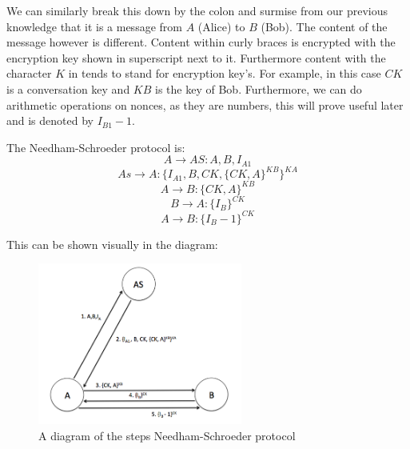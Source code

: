 \documentclass{article}
\begin{document}
\noindent We can similarly break this down by the colon and surmise from our previous
knowledge that it is a message from $A$ (Alice) to $B$ (Bob). The content of the
message however is different. Content within curly braces is encrypted with the
encryption key shown in superscript next to it. Furthermore content with the
character $K$ in tends to stand for encryption key’s. For example, in this case
$CK$ is a conversation key and $KB$ is the key of Bob. Furthermore, we can do
arithmetic operations on nonces, as they are numbers, this will prove useful
later and is denoted by $I_{B1} - 1$.

\medskip

\noindent The Needham-Schroeder protocol is:
\begin{equation}
    A \rightarrow AS: A, B, I_{A1}
\end{equation}
\begin{equation}
    As \rightarrow A: \{ I_{A1}, B, CK, \{CK, A\}^{KB} \}^{KA}
\end{equation}
\begin{equation}
    A \rightarrow B: \{CK, A\}^{KB}
\end{equation}
\begin{equation}
    B \rightarrow A: \{I_B\}^{CK}
\end{equation}
\begin{equation}
    A \rightarrow B: \{I_B - 1\}^{CK}
\end{equation}


\noindent This can be shown visually in the diagram:
\begin{figure}[ht]
    \centering
    \includegraphics[width=0.6\textwidth]{protocolDiagram.png}
    \caption{A diagram of the steps Needham-Schroeder protocol}
    \label{fig:protocolDiagram}
\end{figure}
\end{document}
